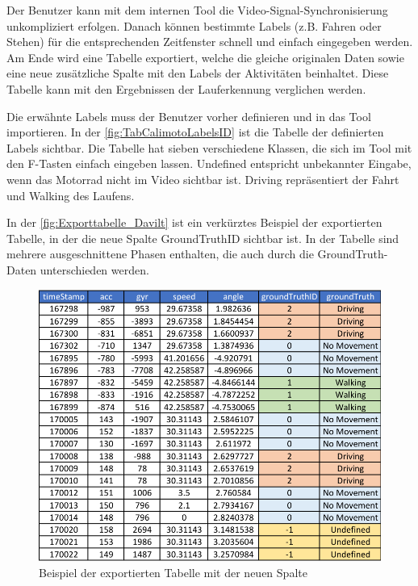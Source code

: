 Der Benutzer kann mit dem internen Tool die Video-Signal-Synchronisierung unkompliziert erfolgen. Danach können bestimmte Labels (z.B. Fahren oder Stehen) für die entsprechenden Zeitfenster schnell und einfach eingegeben werden. Am Ende wird eine Tabelle exportiert, welche die gleiche originalen Daten sowie eine neue zusätzliche Spalte mit den Labels der Aktivitäten beinhaltet.
Diese Tabelle kann mit den Ergebnissen der Lauferkennung verglichen werden.

Die erwähnte Labels muss der Benutzer vorher definieren und in das Tool importieren. In der \autoref{fig:TabCalimotoLabelsID} ist die Tabelle der definierten Labels sichtbar. Die Tabelle hat sieben verschiedene Klassen, die sich im Tool mit den F-Tasten einfach eingeben lassen. \glqq Undefined\grqq{} entspricht unbekannter Eingabe, wenn das Motorrad nicht im Video sichtbar ist. \glqq Driving\grqq{} repräsentiert der Fahrt und \glqq Walking\grqq{} des Laufens.
 
In der \autoref{fig:Exporttabelle_Davilt} ist ein verkürztes Beispiel der exportierten Tabelle, in der die neue Spalte \glqq GroundTruthID\grqq{} sichtbar ist. In der Tabelle sind mehrere ausgeschnittene Phasen enthalten, die auch durch die GroundTruth-Daten unterschieden werden.
\begin{figure}
	\centering
	\includegraphics[width=\linewidth]{Bilder/GriundTruthTabelle.pdf}
	\caption{Beispiel der exportierten Tabelle mit der neuen Spalte}
	\label{fig:Exporttabelle_Davilt}
\end{figure}

